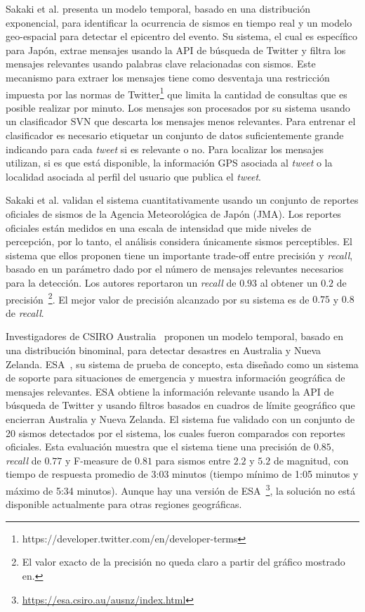 Sakaki et al. \cite{sakaki2013tweet}  presenta un modelo temporal, basado en una distribución exponencial, para identificar la ocurrencia de sismos en tiempo real y un modelo geo-espacial para detectar el epicentro del evento.
%
Su sistema, el cual es específico para Japón, extrae mensajes usando la API de búsqueda de Twitter y filtra los mensajes relevantes usando palabras clave relacionadas con sismos. 
%
Este mecanismo para extraer los mensajes tiene como desventaja una restricción impuesta por las normas de Twitter\footnote{https://developer.twitter.com/en/developer-terms} que limita la cantidad de consultas que es posible realizar por minuto.
%
Los mensajes son procesados por su sistema usando un clasificador SVN que descarta los mensajes menos relevantes. 
%
Para entrenar el clasificador es necesario etiquetar un conjunto de datos suficientemente grande indicando para cada {\em tweet} si es relevante o no.
%
Para localizar los mensajes utilizan, si es que está disponible, la información GPS asociada al {\em tweet} o la localidad asociada al perfil del usuario que publica el {\em tweet}. 

Sakaki et al. validan el sistema cuantitativamente usando un conjunto de reportes oficiales de sismos de la Agencia Meteorológica de Japón (JMA).
%
Los reportes oficiales están medidos en una escala de intensidad que mide niveles de percepción, por lo tanto, el análisis considera únicamente sismos perceptibles.
%
El sistema que ellos proponen tiene un importante trade-off entre precisión y {\em recall}, basado en un parámetro dado por el número de mensajes relevantes necesarios para la detección. 
%
Los autores reportaron un {\em recall} de $0.93$ al obtener un $0.2$ de precisión~\footnote{El valor exacto de la precisión no queda claro a partir del gráfico mostrado en\cite{sakaki2013tweet}.}.
%
El mejor valor de precisión alcanzado por su sistema es de $0.75$ y $0.8$ de {\em recall}.


Investigadores de CSIRO Australia~\cite{yin2012using} proponen un modelo temporal, basado en una distribución binominal, para detectar desastres en Australia y Nueva Zelanda. 
%
ESA~\cite{robinson2013sensitive}, su sistema de prueba de concepto, esta diseñado como un sistema de soporte para situaciones de emergencia y muestra información geográfica de mensajes relevantes. 
%
ESA obtiene la información relevante usando la API de búsqueda de Twitter y usando filtros basados en cuadros de límite geográfico que encierran Australia y Nueva Zelanda.
%
El sistema fue validado con un conjunto de 20 sismos detectados por el sistema, los cuales fueron comparados con reportes oficiales.
%
Esta evaluación muestra que el sistema tiene una precisión de $0.85$, {\em recall} de $0.77$ y F-measure de $0.81$ para sismos entre $2.2$ y $5.2$ de magnitud, con tiempo de respuesta promedio de 3:03 minutos (tiempo mínimo de 1:05 minutos y máximo de 5:34 minutos).
%
Aunque hay una versión de ESA~\footnote{\url{https://esa.csiro.au/ausnz/index.html}}, la solución no está disponible actualmente para otras regiones geográficas. 


